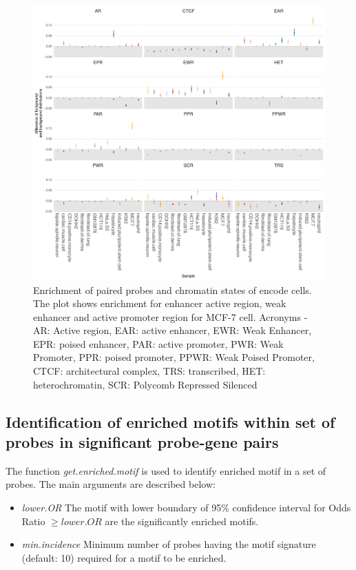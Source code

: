 \begin{figure}[ht!]
\centering
\includegraphics[width=1.0\textwidth]{images/funcivar.pdf}
\caption[ Enrichment of paired probes and chromatin states of encode cells.]{\label{fig:funcivar} Enrichment of paired probes and chromatin states of encode cells.
The plot shows enrichment for enhancer active region, weak enhancer  and active
promoter region for MCF-7 cell. Acronyms - AR: Active region, EAR: active enhancer,
 EWR: Weak Enhancer, EPR: poised enhancer, PAR: active promoter, PWR: Weak Promoter,
 PPR: poised promoter, PPWR: Weak Poised Promoter, CTCF: architectural complex,
 TRS: transcribed, HET: heterochromatin, SCR: Polycomb Repressed Silenced}
\end{figure}


\cleardoublepage

\subsection*{Identification of enriched motifs within set of probes in significant probe-gene pairs}
The function \textit{get.enriched.motif} is used to identify enriched motif in a set of probes.
The main arguments are described below:
\begin{itemize}
\item \textit{lower.OR}	 The motif with lower boundary of 95\% confidence interval for Odds Ratio $\geq lower.OR$  are the significantly enriched motifs.
\item \textit{min.incidence} Minimum number of probes having the motif signature (default: 10) required for a motif to be enriched.
\end{itemize}

